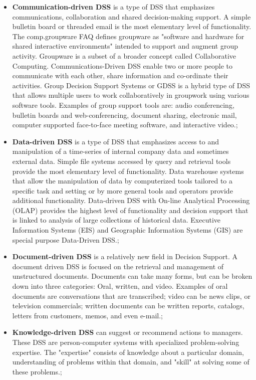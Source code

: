 \begin {itemize}
\item \textbf{Communication-driven DSS} is a type of DSS that emphasizes communications, collaboration and shared decision-making support. A simple bulletin board or threaded email is the most elementary level of functionality. The comp.groupware FAQ defines groupware as "software and hardware for shared interactive environments" intended to support and augment group activity. Groupware is a subset of a broader concept called Collaborative Computing. Communications-Driven DSS enable two or more people to communicate with each other, share information and co-ordinate their activities. Group Decision Support Systems or GDSS is a hybrid type of DSS that allows multiple users to work collaboratively in groupwork using various software tools. Examples of group support tools are: audio conferencing, bulletin boards and web-conferencing, document sharing, electronic mail, computer supported face-to-face meeting software, and interactive video.; 
\item \textbf{Data-driven DSS} is a type of DSS that emphasizes access to and manipulation of a time-series of internal company data and sometimes external data. Simple file systems accessed by query and retrieval tools provide the most elementary level of functionality. Data warehouse systems that allow the manipulation of data by computerized tools tailored to a specific task and setting or by more general tools and operators provide additional functionality. Data-driven DSS with On-line Analytical Processing (OLAP) provides the highest level of functionality and decision support that is linked to analysis of large collections of historical data. Executive Information Systems (EIS) and Geographic Information Systems (GIS) are special purpose Data-Driven DSS.;
\item \textbf{Document-driven DSS} is a relatively new field in Decision Support. A document driven DSS is focused on the retrieval and management of unstructured documents. Documents can take many forms, but can be broken down into three categories: Oral, written, and video. Examples of oral documents are conversations that are transcribed; video can be news clips, or television commercials; written documents can be written reports, catalogs, letters from customers, memos, and even e-mail.;
\item \textbf{Knowledge-driven DSS} can suggest or recommend actions to managers. These DSS are person-computer systems with specialized problem-solving expertise. The "expertise" consists of knowledge about a particular domain, understanding of problems within that domain, and "skill" at solving some of these problems.;

\end{itemize}
